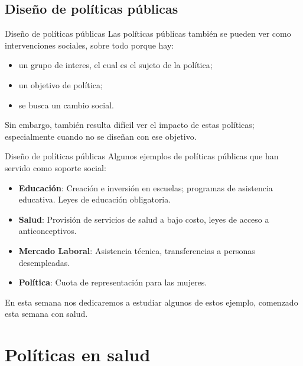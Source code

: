 \documentclass[11pt, aspectratio=169, compress]{beamer}
\begin{document}
\subsection{Diseño de políticas públicas}
\begin{frame}[t]{Diseño de políticas públicas}
	Las políticas públicas también se pueden ver como intervenciones sociales, sobre todo porque hay: 
	\begin{itemize}
		\item un grupo de interes, el cual es el sujeto de la política;  
		\item un objetivo de política; 
		\item se busca un cambio social. 
	\end{itemize}
	Sin embargo, también resulta difícil ver el impacto de estas políticas; especialmente cuando no se diseñan con ese objetivo. 
\end{frame}
\begin{frame}[t]{Diseño de políticas públicas}
	Algunos ejemplos de políticas públicas que han servido como soporte social: 
	\begin{itemize}
		\item \textbf{Educación}: Creación e inversión en escuelas; programas de asistencia educativa. Leyes de educación obligatoria. 
		\item \textbf{Salud}: Provisión de servicios de salud a bajo costo, leyes de acceso a anticonceptivos. 
		\item \textbf{Mercado Laboral}: Asistencia técnica, transferencias a personas desempleadas. 
		\item \textbf{Política}: Cuota de representación para las mujeres. 
	\end{itemize}
	En esta semana nos dedicaremos a estudiar algunos de estos ejemplo, comenzado esta semana con salud. 
\end{frame}
\section{Políticas en salud}
\end{document}
